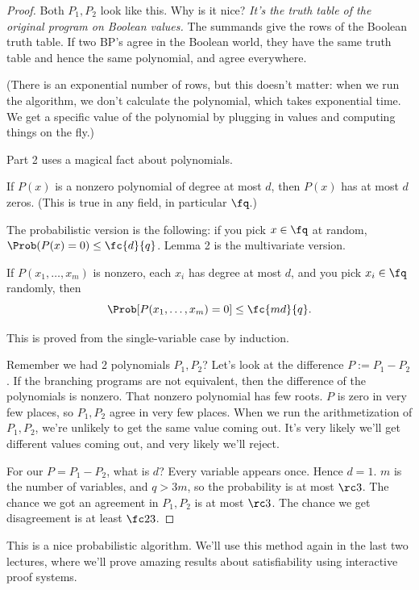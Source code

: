 \begin{proof}
Both $P_1,P_2$ look like this. Why is it nice? {\it It's the truth table of the original program on Boolean values.} %
The summands give the rows of the Boolean truth table. If two BP's agree in the Boolean world, they have the same truth table and hence the same polynomial, and agree everywhere.

(There is an exponential number of rows, but this doesn't matter: when we run the algorithm, we don't calculate the polynomial, which takes exponential time. We get a specific value of the polynomial by plugging in values and computing things on the fly.)

Part 2 uses a magical fact about polynomials. 
\begin{lem}
If $P(x)$ is a nonzero polynomial of degree at most $d$, then $P(x)$ has at most $d$ zeros. (This is true in any field, in particular $\fq$.)
\end{lem}
The probabilistic version is the following: if you pick $x\in \fq$ at random, $\Prob(P(x)=0)\le \fc{d}{q}$.
Lemma 2 is the multivariate version.
\begin{lem}
If $P(x_1,\ldots, x_m)$ is nonzero, each $x_i$ has degree at most $d$, and you pick $x_i\in \fq$ randomly, then 
\[\Prob[P(x_1,\ldots, x_m)=0]\le \fc{md}{q}.\]
\end{lem}
This is proved from the single-variable case by induction.

Remember we had 2 polynomials $P_1,P_2$? Let's look at the difference $P:=P_1-P_2$. If the branching programs are not equivalent, then the difference of the polynomials is nonzero. That nonzero polynomial has few roots. $P$ is zero in very few places, so $P_1,P_2$ agree in very few places. When we run the arithmetization of $P_1,P_2$, we're unlikely to get the same value coming out. It's very likely we'll get different values coming out, and very likely we'll reject.

For our $P=P_1-P_2$, what is $d$? Every variable appears once. Hence $d=1$. $m$ is the number of variables, and $q>3m$, so the probability is at most $\rc3$. The chance we got an agreement in $P_1,P_2$ is at most $\rc3$. The chance we get disagreement is at least $\fc 23$.
\end{proof}

\vskip0.15in
This is a nice probabilistic algorithm. We'll use this method again in the last two lectures, where we'll prove amazing results about satisfiability using interactive proof systems.